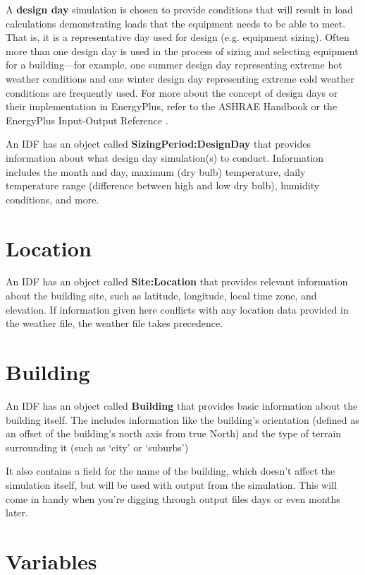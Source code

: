 \documentclass[10pt]{article}
\begin{document}
A \textbf{design day} simulation is chosen to provide conditions that will result in load calculations demonstrating loads that the equipment needs to be able to meet. That is, it is a representative day used for design (e.g. equipment sizing). Often more than one design day is used in the process of sizing and selecting equipment for a building---for example, one summer design day representing extreme hot weather conditions and one winter design day representing extreme cold weather conditions are frequently used. For more about the concept of design days or their implementation in EnergyPlus, refer to the ASHRAE Handbook \cite{ASHRAEhandbook} or the EnergyPlus Input-Output Reference \cite{EP9docs}.

An IDF has an object called \textbf{SizingPeriod:DesignDay} that provides information about what design day simulation(s) to conduct. Information includes the month and day, maximum (dry bulb) temperature, daily temperature range (difference between high and low dry bulb), humidity conditions, and more.

\section{Location}

An IDF has an object called \textbf{Site:Location} that provides relevant information about the building site, such as latitude, longitude, local time zone, and elevation. If information given here conflicts with any location data provided in the weather file, the weather file takes precedence.



\section{Building}

An IDF has an object called \textbf{Building} that provides basic information about the building itself. The includes information like the building's orientation (defined as an offset of the building's north axis from true North) and the type of terrain surrounding it (such as `city' or `suburbs')

It also contains a field for the name of the building, which doesn't affect the simulation itself, but will be used with output from the simulation. This will come in handy when you're digging through output files days or even months later.



\section{Variables}
\end{document}
